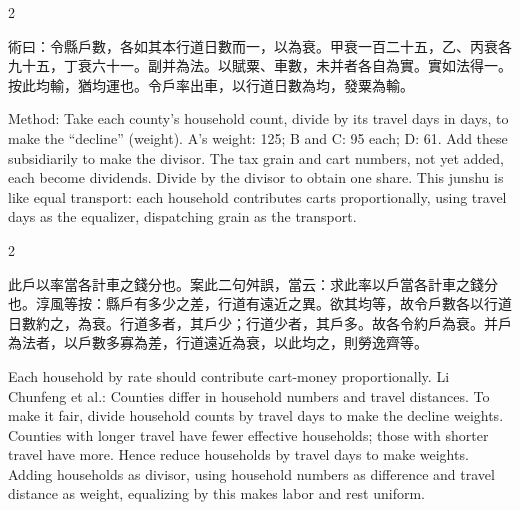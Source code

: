 \documentclass[10pt,a4paper]{article}
\begin{document}
\begin{paracol}{2}

\begin{leftcolumn*}
\begin{methodbi}
術曰：令縣戶數，各如其本行道日數而一，以為衰。甲衰一百二十五，乙、丙衰各九十五，丁衰六十一。副并為法。以賦粟、車數，未并者各自為實。實如法得一。按此均輸，猶均運也。令戶率出車，以行道日數為均，發粟為輸。
\end{methodbi}
\end{leftcolumn*}

\begin{rightcolumn*}
\begin{methodbi}
Method: Take each county's household count, divide by its travel days in days, to make the ``decline'' (weight). A's weight: 125; B and C: 95 each; D: 61. Add these subsidiarily to make the divisor. The tax grain and cart numbers, not yet added, each become dividends. Divide by the divisor to obtain one share. This junshu is like equal transport: each household contributes carts proportionally, using travel days as the equalizer, dispatching grain as the transport.
\end{methodbi}
\end{rightcolumn*}

\end{paracol}

\begin{paracol}{2}

\begin{leftcolumn*}
\begin{commentarybi}
此戶以率當各計車之錢分也。案此二句舛誤，當云：求此率以戶當各計車之錢分也。淳風等按：縣戶有多少之差，行道有遠近之異。欲其均等，故令戶數各以行道日數約之，為衰。行道多者，其戶少；行道少者，其戶多。故各令約戶為衰。并戶為法者，以戶數多寡為差，行道遠近為衰，以此均之，則勞逸齊等。
\end{commentarybi}
\end{leftcolumn*}

\begin{rightcolumn*}
\begin{commentarybi}
Each household by rate should contribute cart-money proportionally. Li Chunfeng et al.: Counties differ in household numbers and travel distances. To make it fair, divide household counts by travel days to make the decline weights. Counties with longer travel have fewer effective households; those with shorter travel have more. Hence reduce households by travel days to make weights. Adding households as divisor, using household numbers as difference and travel distance as weight, equalizing by this makes labor and rest uniform.
\end{commentarybi}
\end{rightcolumn*}

\end{paracol}
\end{document}
